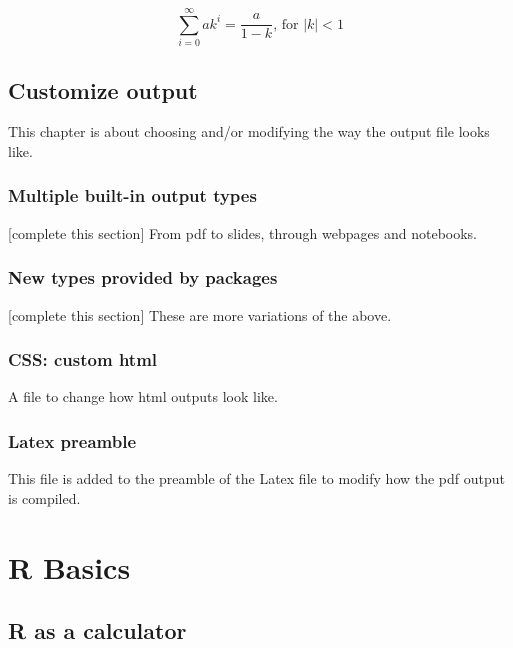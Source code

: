 \documentclass[]{book}
\theoremstyle{definition}
\theoremstyle{definition}
\theoremstyle{definition}
\theoremstyle{remark}
\begin{document}
\[
\sum_{i=0}^{\infty} ak^{i} = \frac{a}{1-k} \text{, for }  \lvert k \rvert < 1
\]

\hypertarget{custom-ouptut}{%
\chapter{Customize output}\label{custom-ouptut}}

This chapter is about choosing and/or modifying the way the output file
looks like.

\hypertarget{multiple-built-in-output-types}{%
\section{Multiple built-in output
types}\label{multiple-built-in-output-types}}

{[}complete this section{]} From pdf to slides, through webpages and
notebooks.

\hypertarget{new-types-provided-by-packages}{%
\section{New types provided by
packages}\label{new-types-provided-by-packages}}

{[}complete this section{]} These are more variations of the above.

\hypertarget{css-custom-html}{%
\section{CSS: custom html}\label{css-custom-html}}

A file to change how html outputs look like.

\hypertarget{latex-preamble}{%
\section{Latex preamble}\label{latex-preamble}}

This file is added to the preamble of the Latex file to modify how the
pdf output is compiled.

\hypertarget{part-r-basics}{%
\part{R Basics}\label{part-r-basics}}

\hypertarget{rcalc}{%
\chapter{R as a calculator}\label{rcalc}}
\end{document}
